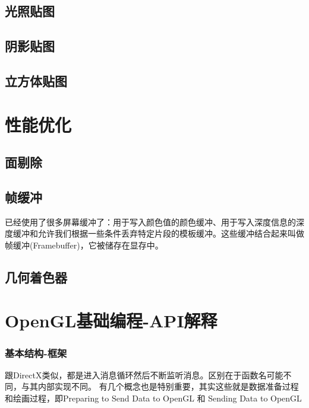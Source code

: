 \documentclass[UTF8,a4paper,12pt]{ctexbook}
\begin{document}
	\section{光照贴图}


	\section{阴影贴图}
	

	\section{立方体贴图}
	
	
	


\chapter{性能优化}	
	\section{面剔除}
	
	
	\section{帧缓冲}
		已经使用了很多屏幕缓冲了：用于写入颜色值的颜色缓冲、用于写入深度信息的深度缓冲和允许我们根据一些条件丢弃特定片段的模板缓冲。这些缓冲结合起来叫做帧缓冲(Framebuffer)，它被储存在显存中。
	
	
	\section{几何着色器}
		
		
		
		
			
			
			
\chapter{OpenGL基础编程-API解释}
	
	\subsection{基本结构-框架}
		跟DirectX类似，都是进入消息循环然后不断监听消息。区别在于函数名可能不同，与其内部实现不同。
		有几个概念也是特别重要，其实这些就是数据准备过程和绘画过程，即Preparing to Send Data to OpenGL 和 Sending Data to OpenGL
		
\end{document}
